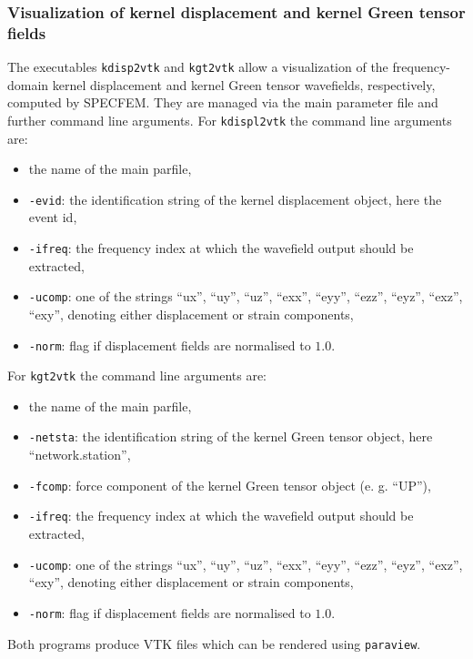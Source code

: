 \subsubsection{Visualization of kernel displacement and kernel Green tensor fields}
%
The executables \verb+kdisp2vtk+ and \verb+kgt2vtk+ allow a visualization of the frequency-domain kernel displacement and kernel Green tensor wavefields, respectively, computed by SPECFEM. They are managed via the main parameter file and further command line arguments. For \verb+kdispl2vtk+ the command line arguments are:
\begin{itemize}
	\setlength{\itemsep}{-0.1cm}
   \item the name of the main parfile,
   \item \verb+-evid+: the identification string of the kernel displacement object, here the event id,
   \item \verb+-ifreq+: the frequency index at which the wavefield output should be extracted,
   \item \verb+-ucomp+: one of the strings ``ux'', ``uy'', ``uz'', ``exx'', ``eyy'', ``ezz'', ``eyz'', ``exz'', ``exy'', denoting either displacement or strain components,
   \item \verb+-norm+: flag if displacement fields are normalised to $1.0$.
\end{itemize}
For \verb+kgt2vtk+ the command line arguments are:
\begin{itemize}
	\setlength{\itemsep}{-0.1cm}
   \item the name of the main parfile,
   \item \verb+-netsta+: the identification string of the kernel Green tensor object, here ``network.station'',
   \item \verb+-fcomp+: force component of the kernel Green tensor object (e. g. ``UP''),
   \item \verb+-ifreq+: the frequency index at which the wavefield output should be extracted,
   \item \verb+-ucomp+: one of the strings ``ux'', ``uy'', ``uz'', ``exx'', ``eyy'', ``ezz'', ``eyz'', ``exz'', ``exy'', denoting either displacement or strain components,
   \item \verb+-norm+: flag if displacement fields are normalised to $1.0$.
\end{itemize}
Both programs produce VTK files which can be rendered using \verb+paraview+.